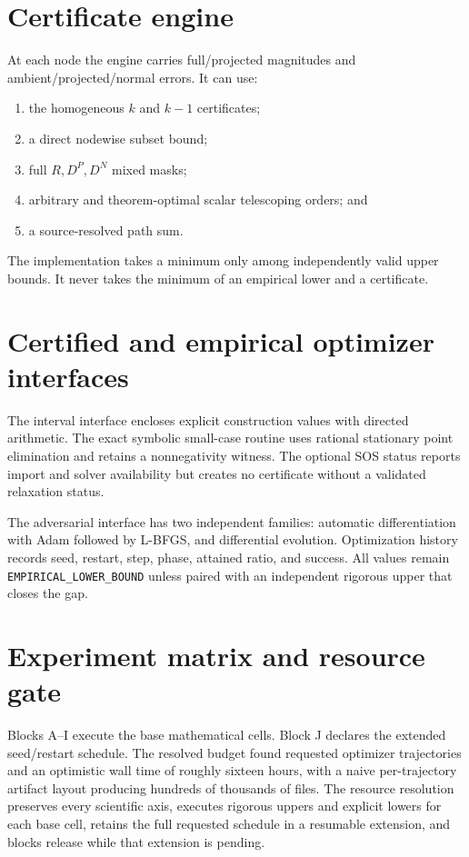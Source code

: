 \documentclass[11pt]{amsart}
\begin{document}
\section{Certificate engine}

At each node the engine carries full/projected magnitudes and
ambient/projected/normal errors.  It can use:

\begin{enumerate}[leftmargin=*]
\item the homogeneous \(k\) and \(k-1\) certificates;
\item a direct nodewise subset bound;
\item full \(R,D^P,D^N\) mixed masks;
\item arbitrary and theorem-optimal scalar telescoping orders; and
\item a source-resolved path sum.
\end{enumerate}

The implementation takes a minimum only among independently valid upper
bounds.  It never takes the minimum of an empirical lower and a certificate.

\section{Certified and empirical optimizer interfaces}

The interval interface encloses explicit construction values with directed
arithmetic.  The exact symbolic small-case routine uses rational stationary
point elimination and retains a nonnegativity witness.  The optional SOS
status reports import and solver availability but creates no certificate
without a validated relaxation status.

The adversarial interface has two independent families: automatic
differentiation with Adam followed by L-BFGS, and differential evolution.
Optimization history records seed, restart, step, phase, attained ratio, and
success.  All values remain \texttt{EMPIRICAL\_LOWER\_BOUND} unless paired
with an independent rigorous upper that closes the gap.

\section{Experiment matrix and resource gate}

Blocks A--I execute the base mathematical cells.  Block J declares the
extended seed/restart schedule.  The resolved budget found
\VThreeExtendedTrajectories{} requested optimizer trajectories and an
optimistic wall time of roughly sixteen hours, with a naive per-trajectory
artifact layout producing hundreds of thousands of files.  The resource
resolution preserves every scientific axis, executes rigorous uppers and
explicit lowers for each base cell, retains the full requested schedule in a
resumable extension, and blocks release while that extension is pending.
\end{document}
